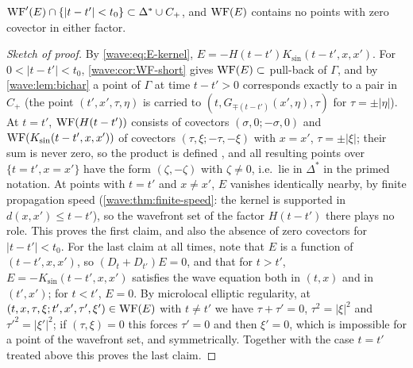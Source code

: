 \begin{lemma}\label{wave:lem:WF-E}
$\operatorname{WF}'(E)\cap\{|t-t'|<t_0\}\subset\Delta^*\cup C_+$, and $\operatorname{WF}(E)$ contains no
points with zero covector in either factor.
\end{lemma}
\begin{proof}[Sketch of proof]
By \eqref{wave:eq:E-kernel}, $E=-H(t-t')K_{\sin}(t-t',x,x')$. For
$0<|t-t'|<t_0$, \cref{wave:cor:WF-short} gives $\operatorname{WF}(E)\subset$ pull-back of $\Gamma$, and by
\cref{wave:lem:bichar} a point of $\Gamma$ at time $t-t'>0$ corresponds exactly to a pair
in $C_+$ (the point $(t',x',\tau,\eta)$ is carried to $(t,G_{\mp(t-t')}(x',\eta),\tau)$ for
$\tau=\pm|\eta|$). At $t=t'$, $\operatorname{WF}(H(t-t'))$ consists of covectors $(\sigma,0;-\sigma,0)$ and
$\operatorname{WF}(K_{\sin}(t-t',x,x'))$ of covectors $(\tau,\xi;-\tau,-\xi)$ with $x=x'$, $\tau=\pm|\xi|$; their sum
is never zero, so the product is defined \cite[Section~8.2]{Hormander-I}, and all
resulting points over $\{t=t',x=x'\}$ have the form $(\zeta,-\zeta)$ with $\zeta\ne0$, i.e.\ lie in
$\Delta^*$ in the primed notation. At points with $t=t'$ and $x\ne x'$, $E$ vanishes
identically nearby, by finite propagation speed (\cref{wave:thm:finite-speed}: the
kernel is supported in $d(x,x')\le t-t'$), so the wavefront set of the factor $H(t-t')$
there plays no role. This proves the first claim, and also the absence of zero
covectors for $|t-t'|<t_0$. For the last claim at all times, note that $E$ is a function
of $(t-t',x,x')$, so $(D_t+D_{t'})E=0$, and that for $t>t'$, $E=-K_{\sin}(t-t',x,x')$
satisfies the wave equation both in $(t,x)$ and in $(t',x')$; for $t<t'$, $E=0$. By
microlocal elliptic regularity, at $(t,x,\tau,\xi;t',x',\tau',\xi')\in\operatorname{WF}(E)$ with
$t\ne t'$ we have $\tau+\tau'=0$, $\tau^2=|\xi|^2$ and $\tau'^2=|\xi'|^2$; if
$(\tau,\xi)=0$ this forces $\tau'=0$ and then $\xi'=0$, which is impossible for a point
of the wavefront set, and symmetrically. Together with the case $t=t'$ treated above
this proves the last claim.
\end{proof}

